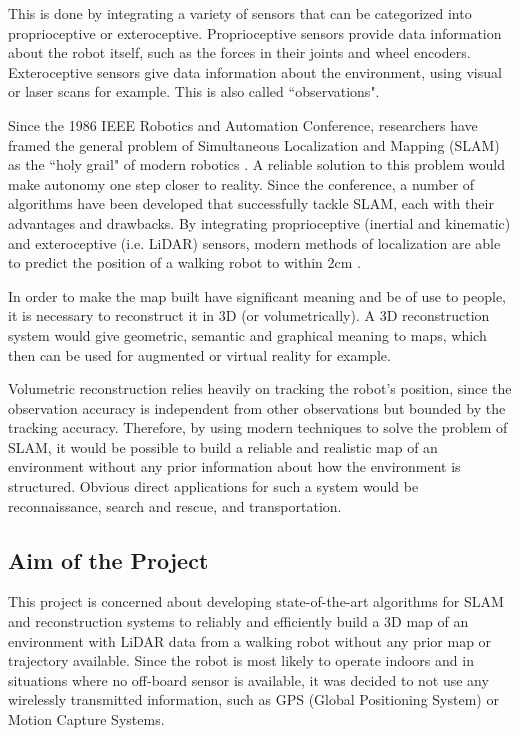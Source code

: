 \documentclass[11pt]{article}
\begin{document}
This is done by integrating a variety of sensors that can be categorized into proprioceptive or exteroceptive. Proprioceptive sensors provide data information about the robot itself, such as the forces in their joints and wheel encoders. Exteroceptive sensors give data information about the environment, using visual or laser scans for example. This is also called ``observations".
	
Since the 1986 IEEE Robotics and Automation Conference, researchers have framed the general problem of Simultaneous Localization and Mapping (SLAM) as the ``holy grail" of modern robotics \cite{SLAMPartI}. A reliable solution to this problem would make autonomy one step closer to reality. Since the conference, a number of algorithms have been developed that successfully tackle SLAM, each with their advantages and drawbacks. By integrating proprioceptive (inertial and kinematic) and exteroceptive (i.e. LiDAR) sensors, modern methods of localization are able to predict the position of a walking robot to within 2cm \cite{7041346}.
	
In order to make the map built have significant meaning and be of use to people, it is necessary to reconstruct it in 3D (or volumetrically). A 3D reconstruction system would give geometric, semantic and graphical meaning to maps, which then can be used for augmented or virtual reality for example.
	
Volumetric reconstruction relies heavily on tracking the robot's position, since the observation accuracy is independent from other observations but bounded by the tracking accuracy. Therefore, by using modern techniques to solve the problem of SLAM, it would be possible to build a reliable and realistic map of an environment without any prior information about how the environment is structured. Obvious direct applications for such a system would be reconnaissance, search and rescue, and transportation.
	
	\subsection{Aim of the Project}

This project is concerned about developing state-of-the-art algorithms for SLAM and reconstruction systems to reliably and efficiently build a 3D map of an environment with LiDAR data from a walking robot without any prior map or trajectory available. Since the robot is most likely to operate indoors and in situations where no off-board sensor is available, it was decided to not use any wirelessly transmitted information, such as GPS (Global Positioning System) or Motion Capture Systems.
	
\end{document}
